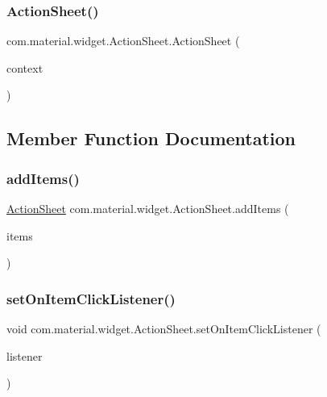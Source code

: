 \subsubsection{\texorpdfstring{Action\+Sheet()}{ActionSheet()}}
{\footnotesize\ttfamily com.\+material.\+widget.\+Action\+Sheet.\+Action\+Sheet (\begin{DoxyParamCaption}\item[{Context}]{context }\end{DoxyParamCaption})}



\subsection{Member Function Documentation}
\mbox{\label{classcom_1_1material_1_1widget_1_1_action_sheet_a7a7bace5c73bbb7642d5a18e5db3041a}} 
\subsubsection{\texorpdfstring{add\+Items()}{addItems()}}
{\footnotesize\ttfamily \hyperlink{classcom_1_1material_1_1widget_1_1_action_sheet}{Action\+Sheet} com.\+material.\+widget.\+Action\+Sheet.\+add\+Items (\begin{DoxyParamCaption}\item[{List$<$ \hyperlink{classcom_1_1material_1_1widget_1_1_action_sheet_1_1_item}{Item} $>$}]{items }\end{DoxyParamCaption})}

\mbox{\label{classcom_1_1material_1_1widget_1_1_action_sheet_a228dc1e980bd262ce8ee2cd9847ee141}} 
\subsubsection{\texorpdfstring{set\+On\+Item\+Click\+Listener()}{setOnItemClickListener()}}
{\footnotesize\ttfamily void com.\+material.\+widget.\+Action\+Sheet.\+set\+On\+Item\+Click\+Listener (\begin{DoxyParamCaption}\item[{On\+Item\+Click\+Listener}]{listener }\end{DoxyParamCaption})}

